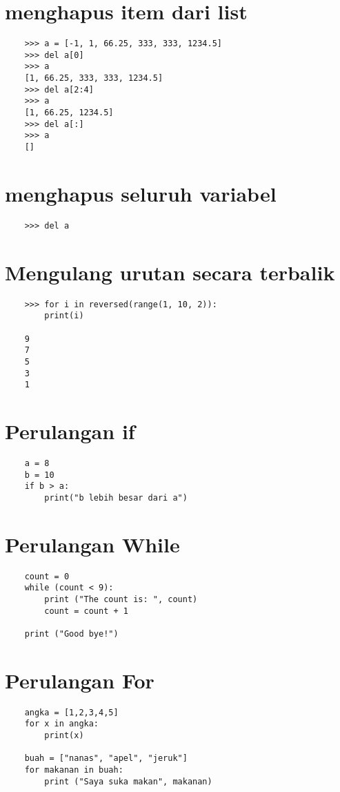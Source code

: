 \documentclass[12pt]{article} %
\begin{document}
\section{menghapus item dari list}
\begin{lstlisting}
	>>> a = [-1, 1, 66.25, 333, 333, 1234.5]
	>>> del a[0]
	>>> a
	[1, 66.25, 333, 333, 1234.5]
	>>> del a[2:4]
	>>> a
	[1, 66.25, 1234.5]
	>>> del a[:]
	>>> a
	[]
\end{lstlisting}

\section{menghapus seluruh variabel}
\begin{lstlisting}
	>>> del a
\end{lstlisting}

\section{Mengulang urutan secara terbalik}
\begin{lstlisting}
	>>> for i in reversed(range(1, 10, 2)):
		print(i)
	
	9
	7
	5
	3
	1
\end{lstlisting}

\section{Perulangan if}
\begin{lstlisting}
	a = 8
	b = 10
	if b > a:
		print("b lebih besar dari a")
\end{lstlisting}

\section{Perulangan While}
\begin{lstlisting}
	count = 0
	while (count < 9):
	    print ("The count is: ", count)
	    count = count + 1
	
	print ("Good bye!")
\end{lstlisting}

\section{Perulangan For}
\begin{lstlisting}
	angka = [1,2,3,4,5]
	for x in angka:
	    print(x)
	
	buah = ["nanas", "apel", "jeruk"]
	for makanan in buah:
	    print ("Saya suka makan", makanan)
\end{lstlisting}
\end{document}

